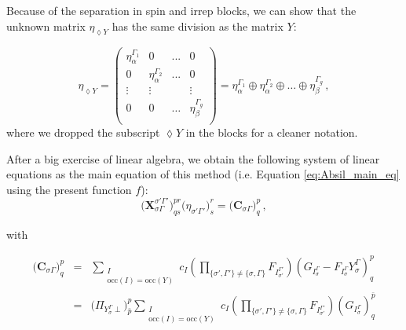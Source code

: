 \documentclass[a4paper,11pt]{article}
\newcommand{\irp}{\ensuremath{\Gamma}}
\newcommand{\irpP}{{\ensuremath{\Gamma'}}}
\begin{document}
Because of the separation in spin and irrep blocks, we can show that the unknown matrix $\eta_{\lozenge Y}$ has the same division as the matrix $Y$:

\begin{equation}\label{eq:eta_spin_irrep_blocks}
  \eta_{\lozenge Y} =
  \begin{pmatrix}
    \eta_\alpha^{\irp_1} & 0 & ... & 0\\
    0 & \eta_\alpha^{\irp_2} & ... & 0 \\
    \vdots & \vdots & & \vdots\\
    0 & 0 &\dots & \eta_\beta^{\irp_g}\\
  \end{pmatrix}
  = \eta_\alpha^{\irp_1} \oplus \eta_\alpha^{\irp_2} \oplus \dots \oplus \eta_\beta^{\irp_g}\,,
\end{equation}
where we dropped the subscript $\lozenge Y$ in the blocks for a cleaner notation.

After a big exercise of linear algebra, we obtain the following system of linear equations as the main equation of this method (i.e. Equation \eqref{eq:Absil_main_eq} using the present function $f$):
\begin{equation}
  \big( \mathbf{X}_{\sigma \irp}^{\sigma' \irpP} \big)^{pr}_{qs} \big( \eta_{\sigma' \irpP} \big)^r_s
  = \big( \mathbf{C}_{\sigma \irp} \big)^p_q\,,
\end{equation}

with

\begin{eqnarray}
  \big( \mathbf{C}_{\sigma \irp} \big)^p_q &=&
  \sum_{\substack{I\\\text{occ}(I) = \text{occ}(Y)}} c_I
  \left( \prod_{\{\sigma', \irpP\} \ne \{\sigma, \irp\}} F_{I_{\sigma'}^\irpP} \right)
  \left( G_{I_\sigma^\irp} - F_{I_\sigma^\irp} Y_\sigma^\irp  \right)^p_q\\
  &=&
  \big( \Pi_{Y_\sigma^\irp \perp} \big)^p_{\bar{p}}
  \sum_{\substack{I\\\text{occ}(I) = \text{occ}(Y)}} c_I
  \left( \prod_{\{\sigma', \irpP\} \ne \{\sigma, \irp\}} F_{I_{\sigma'}^\irpP} \right)
  \left( G_{I_\sigma^\irp} \right)^{\bar{p}}_q
\end{eqnarray}
\end{document}
